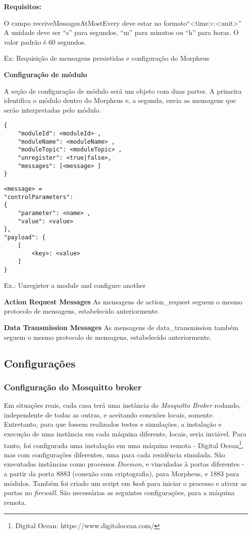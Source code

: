 \textbf{Requisitos:}

O campo receiveMessagesAtMostEvery deve estar no formato“\textless time\textgreater :\textless unit\textgreater ”
A unidade deve ser “s” para segundos, “m” para minutos ou “h” para horas. O valor padrão é 60 segundos.

Ex: Requisição de mensagens persistidas e configuração do Morpheus

\textbf{Configuração de módulo}

A seção de configuração de módulo será um objeto com duas partes. A primeira identifica o módulo dentro do Morpheus e, a segunda, envia as mensagens que serão interpretadas pelo módulo.
\begin{lstlisting}
{
    "moduleId": <moduleId> ,
    "moduleName": <moduleName> ,
    "moduleTopic": <moduleTopic> ,
    "unregister": <true|false>,
    "messages": [<message> ]
}
\end{lstlisting}

\begin{lstlisting}
<message> =
"controlParameters":
{
    "parameter": <name> ,
    "value": <value>
},
"payload": {
    [
        <key>: <value>
    ]
}
\end{lstlisting}

Ex.: Unregister a module and configure another


\textbf{Action Request Messages}
As mensagens de action\_request seguem o mesmo protocolo de mensagens, estabelecido anteriormente.

\textbf{Data Transmission Messages}
As mensagens de data\_transmission também seguem o mesmo protocolo de mensagens, estabelecido anteriormente.

\subsection{Configurações}

\subsubsection{Configuração do \wmqtt{} Mosquitto broker}

Em situações reais, cada casa terá uma instância do \emph{Mosquitto Broker} rodando, independente de todas as outras, e aceitando conexões locais, somente. Entretanto, para que fossem realizados testes e simulações, a instalação e execução de uma instância em cada máquina diferente, locais, seria inviável. Para tanto, foi configurada uma instalação em uma máquina remota - Digital Ocean\footnote{Digital Ocean: https://www.digitalocean.com/}, mas com configurações diferentes, uma para cada residência simulada. São executadas instâncias como processos \emph{Daemon}, e vinculadas à portas diferentes - a partir da porta 8883 (conexão com criptografia), para Morpheus, e 1883 para módulos. Também foi criado um script em \emph{bash} para iniciar o processo e ativar as portas no \emph{firewall}. São necessárias as seguintes configurações, para a máquina remota.

